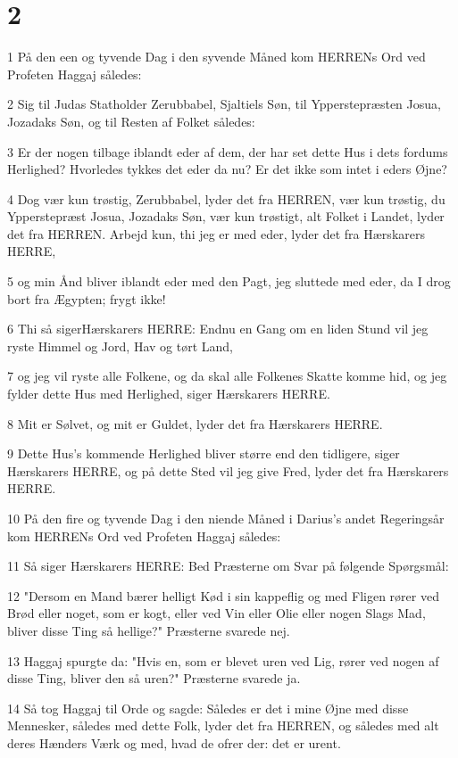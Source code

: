 \chapter{2}

\par 1 På den een og tyvende Dag i den syvende Måned kom HERRENs Ord ved Profeten Haggaj således:
\par 2 Sig til Judas Statholder Zerubbabel, Sjaltiels Søn, til Ypperstepræsten Josua, Jozadaks Søn, og til Resten af Folket således:
\par 3 Er der nogen tilbage iblandt eder af dem, der har set dette Hus i dets fordums Herlighed? Hvorledes tykkes det eder da nu? Er det ikke som intet i eders Øjne?
\par 4 Dog vær kun trøstig, Zerubbabel, lyder det fra HERREN, vær kun trøstig, du Ypperstepræst Josua, Jozadaks Søn, vær kun trøstigt, alt Folket i Landet, lyder det fra HERREN. Arbejd kun, thi jeg er med eder, lyder det fra Hærskarers HERRE,
\par 5 og min Ånd bliver iblandt eder med den Pagt, jeg sluttede med eder, da I drog bort fra Ægypten; frygt ikke!
\par 6 Thi så sigerHærskarers HERRE: Endnu en Gang om en liden Stund vil jeg ryste Himmel og Jord, Hav og tørt Land,
\par 7 og jeg vil ryste alle Folkene, og da skal alle Folkenes Skatte komme hid, og jeg fylder dette Hus med Herlighed, siger Hærskarers HERRE.
\par 8 Mit er Sølvet, og mit er Guldet, lyder det fra Hærskarers HERRE.
\par 9 Dette Hus's kommende Herlighed bliver større end den tidligere, siger Hærskarers HERRE, og på dette Sted vil jeg give Fred, lyder det fra Hærskarers HERRE.
\par 10 På den fire og tyvende Dag i den niende Måned i Darius's andet Regeringsår kom HERRENs Ord ved Profeten Haggaj således:
\par 11 Så siger Hærskarers HERRE: Bed Præsterne om Svar på følgende Spørgsmål:
\par 12 "Dersom en Mand bærer helligt Kød i sin kappeflig og med Fligen rører ved Brød eller noget, som er kogt, eller ved Vin eller Olie eller nogen Slags Mad, bliver disse Ting så hellige?" Præsterne svarede nej.
\par 13 Haggaj spurgte da: "Hvis en, som er blevet uren ved Lig, rører ved nogen af disse Ting, bliver den så uren?" Præsterne svarede ja.
\par 14 Så tog Haggaj til Orde og sagde: Således er det i mine Øjne med disse Mennesker, således med dette Folk, lyder det fra HERREN, og således med alt deres Hænders Værk og med, hvad de ofrer der: det er urent.
